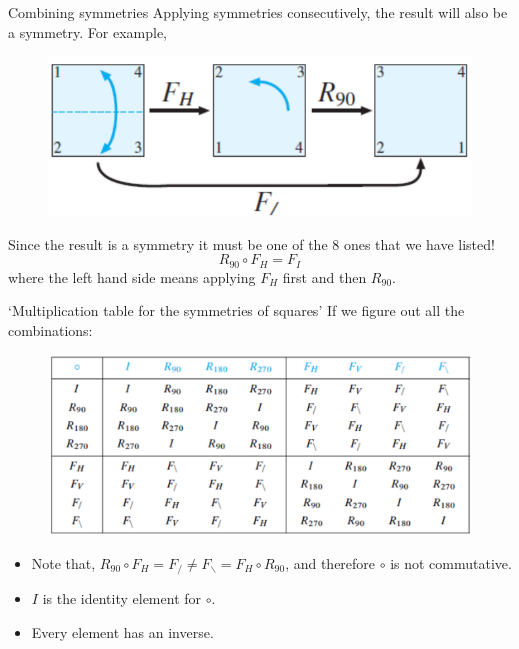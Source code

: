 \documentclass{beamer}
\def\itemb{\begin{itemize}}
\def\iteme{\end{itemize}}
\begin{document}
\begin{frame}{Combining symmetries}
Applying symmetries consecutively, the result will also be a symmetry. For example,
\begin{figure}
\centering
\includegraphics[scale=0.8]{R90circFH.pdf}
\end{figure}
Since the result is a symmetry it must be one of the $8$ ones that we have listed!
\[
R_{90}\circ F_H=F_I
\]
where the left hand side means applying $F_H$ first and then $R_{90}$.
\end{frame}

\begin{frame}{`Multiplication table for the symmetries of squares'}
If we figure out all the combinations:
\begin{figure}
\centering
\includegraphics[scale=0.6]{Multipltable.pdf}
\end{figure}
\itemb
\item Note that, $R_{90}\circ F_H=F_{/}\neq F_{\backslash}=F_H\circ R_{90}$, and therefore $\circ$ is not commutative.
\item $I$ is the identity element for $\circ$.
\item Every element has an inverse.
\iteme
\end{frame}
\end{document}
